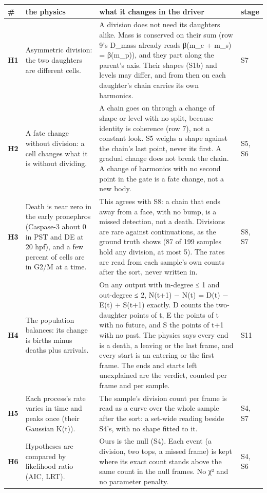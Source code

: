 {\footnotesize
\setlength{\tabcolsep}{6pt}
\begin{longtable}{>{\RaggedRight\arraybackslash}p{}>{\RaggedRight\arraybackslash}p{}>{\RaggedRight\arraybackslash}p{}>{\RaggedRight\arraybackslash}p{}}
\toprule
\# & the physics & what it changes in the driver & stage \\
\midrule
\endhead
\textbf{H1} & Asymmetric division: the two daughters are different cells. & A division does not need its daughters alike. Mass is conserved on their sum (row 9's D\_\allowbreak{}mass already reads β(m\_\allowbreak{}c + m\_\allowbreak{}s) = β(m\_\allowbreak{}p)), and they part along the parent's axis. Their shapes (S1b) and levels may differ, and from then on each daughter's chain carries its own harmonics. & S7 \\
\textbf{H2} & A fate change without division: a cell changes what it is without dividing. & A chain goes on through a change of shape or level with no split, because identity is coherence (row 7), not a constant look. S5 weighs a shape against the chain's last point, never its first. A gradual change does not break the chain. A change of harmonics with no second point in the gate is a fate change, not a new body. & S5, S6 \\
\textbf{H3} & Death is near zero in the early pronephros (Caspase-3 about 0 in PST and DE at 20 hpf), and a few percent of cells are in G2/M at a time. & This agrees with S8: a chain that ends away from a face, with no bump, is a missed detection, not a death. Divisions are rare against continuations, as the ground truth shows (87 of 199 samples hold any division, at most 5). The rates are read from each sample's own counts after the sort, never written in. & S8, S7 \\
\textbf{H4} & The population balances: its change is births minus deaths plus arrivals. & On any output with in-degree ≤ 1 and out-degree ≤ 2, N(t+1) − N(t) = D(t) − E(t) + S(t+1) exactly. D counts the two-daughter points of t, E the points of t with no future, and S the points of t+1 with no past. The physics says every end is a death, a leaving or the last frame, and every start is an entering or the first frame. The ends and starts left unexplained are the verdict, counted per frame and per sample. & S11 \\
\textbf{H5} & Each process's rate varies in time and peaks once (their Gaussian K(t)). & The sample's division count per frame is read as a curve over the whole sample after the sort: a set-wide reading beside S4's, with no shape fitted to it. & S4, S7 \\
\textbf{H6} & Hypotheses are compared by likelihood ratio (AIC, LRT). & Ours is the null (S4). Each event (a division, two tops, a missed frame) is kept where its exact count stands above the same count in the null frames. No χ² and no parameter penalty. & S4, S6 \\
\bottomrule
\end{longtable}
}

